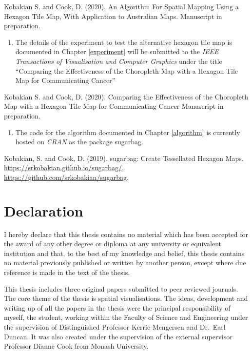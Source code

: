 \documentclass{monashthesis}
\begin{document}
Kobakian S. and Cook, D. (2020). An Algorithm For Spatial Mapping Using a Hexagon Tile Map, With Application to Australian Maps. Manuscript in preparation.

\begin{enumerate}
\def\labelenumi{\arabic{enumi}.}
\setcounter{enumi}{2}
\tightlist
\item
  The details of the experiment to test the alternative hexagon tile map is documented in Chapter \ref{experiment} will be submitted to the \emph{IEEE Transactions of Visualisation and Computer Graphics} under the title ``Comparing the Effectiveness of the Choropleth Map with a Hexagon Tile Map for Communicating Cancer''
\end{enumerate}

Kobakian S. and Cook, D. (2020). Comparing the Effectiveness of the Choropleth Map with a Hexagon Tile Map for Communicating Cancer Manuscript in preparation.

\begin{enumerate}
\def\labelenumi{\arabic{enumi}.}
\setcounter{enumi}{3}
\tightlist
\item
  The code for the algorithm documented in Chapter \ref{algorithm} is currently hosted on \emph{CRAN} as the package sugarbag.
\end{enumerate}

Kobakian, S. and Cook, D. (2019). sugarbag: Create Tessellated Hexagon Maps. \url{https://srkobakian.github.io/sugarbag/}, \url{https://github.com/srkobakian/sugarbag}.

\clearpage{}\setcounter{page}{0}

\hypertarget{declaration}{%
\chapter*{Declaration}\label{declaration}}

I hereby declare that this thesis contains no material which has been accepted for the award of any other degree or diploma at any university or equivalent institution and that, to the best of my knowledge and belief, this thesis contains no material previously published or written by another person, except where due reference is made in the text of the thesis.

This thesis includes three original papers submitted to peer reviewed journals. The core theme of the thesis is spatial visualisations. The ideas, development and writing up of all the papers in the thesis were the principal responsibility of myself, the student, working within the Faculty of Science and Engineering under the supervision of Distinguished Professor Kerrie Mengersen and Dr.~Earl Duncan. It was also created under the supervision of the external supervisor Professor Dianne Cook from Monash University.
\end{document}
